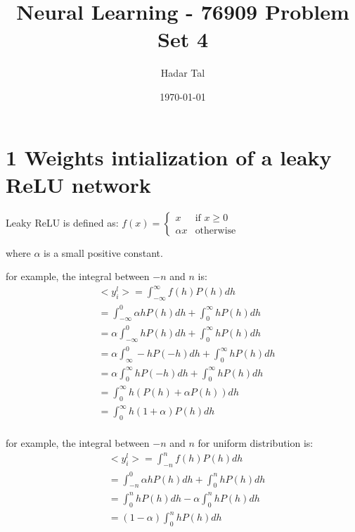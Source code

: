 \documentclass[a4paper, 12pt]{article}
\title{Neural Learning - 76909 Problem Set 4}
\author{Hadar Tal}
\date{\today}
\begin{document}
\maketitle

\section*{1 Weights intialization of a leaky ReLU network}

Leaky ReLU is defined as:
$    f(x) = \begin{cases}
        x & \text{if } x \ge 0 \\
        \alpha x & \text{otherwise}
    \end{cases}
    \label{eq:leaky_relu}
$


where $\alpha$ is a small positive constant. 

for example, the integral between $-n$ and $n$ is:
\begin{align*} 
    & <y_{i}^l> = \int_{-\infty}^{\infty} f(h) P(h) dh \\
    &= \int_{-\infty}^{0} \alpha h  P(h) dh + \int_{0}^{\infty} h P(h) dh \\
    &= \alpha \int_{-\infty}^{0} h  P(h) dh + \int_{0}^{\infty} h P(h) dh \\
    &= \alpha \int_{\infty}^{0} -h  P(-h) dh + \int_{0}^{\infty} h P(h) dh \\
    &= \alpha \int_{0}^{\infty} h  P(-h) dh + \int_{0}^{\infty} h P(h) dh \\
    &= \int_{0}^{\infty} h  (P(h) + \alpha P(h)) dh \\
    &= \int_{0}^{\infty} h  (1 + \alpha) P(h) dh \\
\end{align*}

for example, the integral between $-n$ and $n$ for uniform distribution is:
\begin{align*} 
    & <y_{i}^l> = \int_{-n}^{n} f(h) P(h) dh \\
    &= \int_{-n}^{0} \alpha h  P(h) dh + \int_{0}^{n} h P(h) dh \\
    &= \int_{0}^{n} h P(h) dh - \alpha \int_{0}^{n} h  P(h) dh \\
    &= (1 - \alpha)  \int_{0}^{n} h P(h) dh \\
\end{align*}
\end{document}
